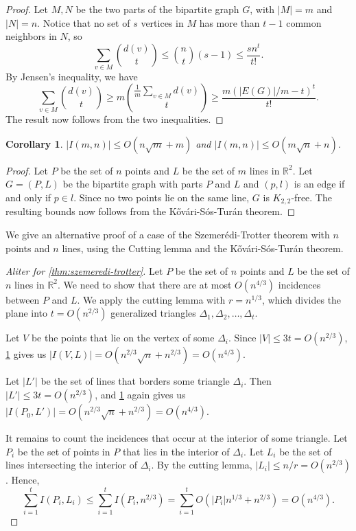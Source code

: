 \documentclass[10pt,reqno]{amsart}
\newtheorem{corollary}[theorem]{Corollary}
\theoremstyle{definition}
\theoremstyle{remark}
\renewcommand{\leq}{\leqslant}
\renewcommand{\geq}{\geqslant}
\def\R{\mathbb{R}}
\numberwithin{equation}{section}
\begin{document}
\begin{proof}
	Let $M, N$ be the two parts of the bipartite graph $G$, with $|M| = m$ and $|N| = n$. Notice that no set of $s$ vertices in $M$ has more than $t - 1$ common neighbors in $N$, so
	\[
		\sum_{v \in M} \binom{d(v)}{t} \leq \binom{n}{t} (s - 1) \leq \frac{sn^t}{t!}.
	\]
	By Jensen's inequality, we have
	\[
		\sum_{v \in M} \binom{d(v)}{t} \geq m\binom{\frac{1}{m}\sum_{v \in M} d(v)}{t} \geq \frac{m(|E(G)|/m - t)^t}{t!}.
	\]
	The result now follows from the two inequalities.
\end{proof}

\begin{corollary}\label{cor:ks}
	$|I(m, n)| \leq O(n\sqrt{m} + m)$ and $|I(m, n)| \leq O(m\sqrt{n} + n)$.
\end{corollary}

\begin{proof}
	Let $P$ be the set of $n$ points and $L$ be the set of $m$ lines in $\R^2$. Let $G = (P, L)$ be the bipartite graph with parts $P$ and $L$ and $(p, l)$ is an edge if and only if $p \in l$. Since no two points lie on the same line, $G$ is $K_{2, 2}$-free. The resulting bounds now follows from the Kővári-Sós-Turán theorem.
\end{proof}

We give an alternative proof of a case of the Szemerédi-Trotter theorem with $n$ points and $n$ lines, using the Cutting lemma and the Kővári-Sós-Turán theorem.

\begin{proof}[Aliter for \cref{thm:szemeredi-trotter}]
	Let $P$ be the set of $n$ points and $L$ be the set of $n$ lines in $\R^2$. We need to show that there are at most $O(n^{4/3})$ incidences between $P$ and $L$. We apply the cutting lemma with $r = n^{1/3}$, which divides the plane into $t = O(n^{2/3})$ generalized triangles $\Delta_1, \Delta_2, \ldots, \Delta_t$. 
	
	Let $V$ be the points that lie on the vertex of some $\Delta_i$. Since $|V| \leq 3t = O(n^{2/3})$, \cref{cor:ks} gives us $|I(V, L)| = O(n^{2/3}\sqrt{n} + n^{2/3}) = O(n^{4/3})$.

	Let $|L'|$ be the set of lines that borders some triangle $\Delta_i$. Then $|L'| \leq 3t = O(n^{2/3})$, and \cref{cor:ks} again gives us $|I(P_0, L')| = O(n^{2/3}\sqrt{n} + n^{2/3}) = O(n^{4/3})$.

	It remains to count the incidences that occur at the interior of some triangle. Let $P_i$ be the set of points in $P$ that lies in the interior of $\Delta_i$. Let $L_i$ be the set of lines intersecting the interior of $\Delta_i$. By the cutting lemma, $|L_i| \leq n/r = O(n^{2/3})$. Hence,
	\[
		\sum_{i = 1}^t I(P_i, L_i) \leq \sum_{i = 1}^t I(P_i, n^{2/3}) = \sum_{i = 1}^t O(|P_i|n^{1/3} + n^{2/3}) = O(n^{4/3}).
	\]
\end{proof}
\end{document}
